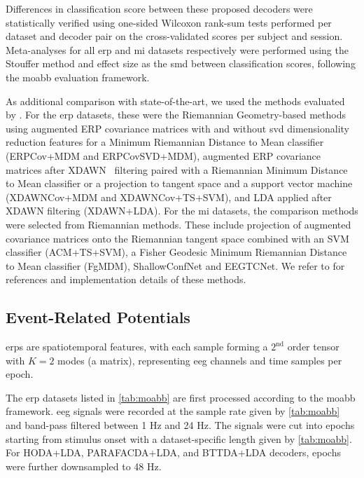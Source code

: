 \documentclass[twocolumn]{article}
\begin{document}
Differences in classification score between these proposed decoders
were statistically verified using one-sided Wilcoxon rank-sum tests performed per
dataset and decoder
pair on the cross-validated scores per subject and session.
Meta-analyses for all \ac{erp} and \ac{mi} datasets respectively
were performed using the Stouffer method and effect size as the \ac{smd} between classification scores, following the \ac{moabb} evaluation framework.

As additional comparison with state-of-the-art, we used the methods evaluated by
\textcite{Chevallier2024}.
For the \ac{erp} datasets, these were the Riemannian Geometry-based methods
using augmented ERP covariance matrices with and without \acl{svd} dimensionality
reduction features for a Minimum Riemannian Distance to Mean classifier
(ERPCov+MDM and ERPCovSVD+MDM), augmented ERP covariance matrices after
XDAWN~\cite{Rivet2009}
filtering paired with a Riemannian Minimum Distance to Mean classifier or a
projection to tangent space and a support vector machine
(XDAWNCov+MDM and XDAWNCov+TS+SVM), and LDA applied after XDAWN filtering
(XDAWN+LDA).
For the \ac{mi} datasets, the comparison methods were selected from Riemannian
methods.
These include projection of augmented covariance matrices onto the Riemannian
tangent space combined with an SVM classifier (ACM+TS+SVM), a Fisher Geodesic
Minimum Riemannian Distance to Mean classifier (FgMDM), ShallowConfNet and EEGTCNet.
We refer to \textcite{Chevallier2024} for references and implementation details
of these methods.

\subsection{Event-Related Potentials}
\Acp{erp} are spatiotemporal features, with each sample forming a $2^\text{nd}$
order tensor with $K=2$ modes (a matrix), representing \ac{eeg} channels and time samples
per epoch.

The \ac{erp} datasets listed in \cref{tab:moabb}
are first processed according to the \ac{moabb} framework.
\Ac{eeg} signals were recorded at the sample rate given
by \cref{tab:moabb} and band-pass filtered between 1 Hz
and 24 Hz.
The signals were cut into epochs starting from stimulus onset with a
dataset-specific length given by \cref{tab:moabb}.
For HODA+LDA, PARAFACDA+LDA, and BTTDA+LDA decoders, epochs were further
downsampled to 48 Hz.
\end{document}
